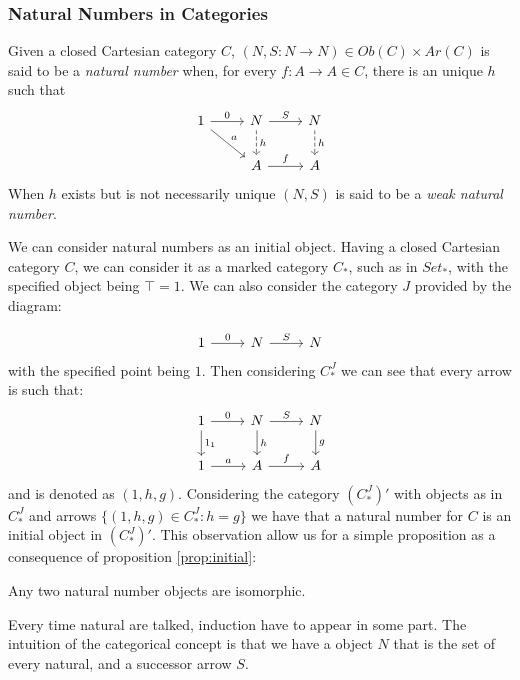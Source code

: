 \subsubsection{Natural Numbers in Categories}


\begin{definition}
  Given a closed Cartesian category $C$,  $(N,S:N\to N)\in Ob(C)\times Ar(C)$ is said to be a \emph{natural number} when, for every $f:A\to A\in C$, there is an unique $h$ such that
  \[
    \begin{tikzcd}
      1\arrow{dr}{a}\arrow{r}{0} & N\arrow{r}{S}\arrow[dashed]{d}{h} & N\arrow[dashed]{d}{h}\\
      & A\arrow{r}{f} & A
    \end{tikzcd}
  \]
  When $h$ exists but is not necessarily unique $(N,S)$ is said to be a \emph{weak natural number}.
\end{definition}

We can consider natural numbers as an initial object. Having a closed Cartesian category $C$, we can consider it as a marked category $C_*$, such as in $Set_*$, with the specified object being $\top =1$. We can also consider the category $J$ provided by the diagram:

\[
  \begin{tikzcd}
    1\arrow{r}{0} & N\arrow{r}{S} & N
  \end{tikzcd}
\]
with the specified point being $1$. Then considering $C_*^J$ we can see that every arrow is such that: 
\[
  \begin{tikzcd}
    1\arrow{r}{0}\arrow{d}{1_1} & N\arrow{r}{S}\arrow{d}{h} & N\arrow{d}{g}\\
    1\arrow{r}{a} & A\arrow{r}{f} & A
  \end{tikzcd}
\]
and is denoted as $(1,h,g)$. Considering the category $(C_*^J)'$ with objects as in $C_*^J$ and arrows  $\{(1,h,g)\in C_*^J: h=g\}$ we have that a natural number for $C$ is an initial object in $(C_*^J)'$. This observation allow us for a simple proposition as a consequence of proposition \ref{prop:initial}:

\begin{proposition}
  Any two natural number objects are isomorphic.
\end{proposition}

Every time natural are talked, induction have to appear in some part. The intuition of the categorical concept is that we have a object $N$ that is the set of every natural, and a successor arrow $S$. 

